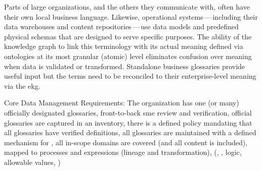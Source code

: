 %
%

\ekgmmContextSection

Parts of large organizations, and the others they communicate with, often have their own local business language.
Likewise, operational systems\,---\,including their data warehouses and content repositories\,---\,use
data models and predefined physical schemas that are designed to serve specific purposes.
The ability of the knowledge graph to link this terminology with its actual meaning defined via ontologies at
its most granular (atomic) level eliminates confusion over meaning when data is validated
or transformed.
Standalone business glossaries provide useful input but the terms need to be reconciled to their
enterprise-level meaning via the \gls{ekg}.

\ekgmmcorequestionssection

%
%

\ekgmmscoringsection

Core Data Management Requirements: The organization has one (or many) officially designated glossaries,
front-to-back \gls{sme} review and verification, official glossaries are captured in an inventory,
there is a defined policy mandating that all glossaries have verified definitions,
all glossaries are maintained with a defined mechanism for ,
all in-scope domains are covered (and all content is included), mapped to processes and expressions
(lineage and transformation),  (, , logic,
allowable values, )

